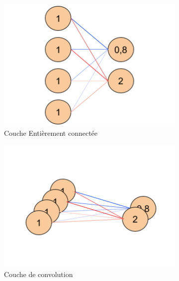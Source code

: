 \begin{figure}[htbp]
\begin{subfigure}{0.32\textwidth}
\includegraphics[width=\linewidth]{figures/LinearLayer(1).png}
\caption{Couche Entièrement connectée} \label{fig:linear}
\end{subfigure}
\hspace*{\fill} %
\begin{subfigure}{0.32\textwidth}
\includegraphics[width=\linewidth]{figures/FConvolutional(1).png}
\caption{Couche de convolution} \label{fig:conv}
\end{subfigure}
\hspace*{\fill} %
\begin{subfigure}{0.32\textwidth}

\end{subfigure}
\end{figure}
